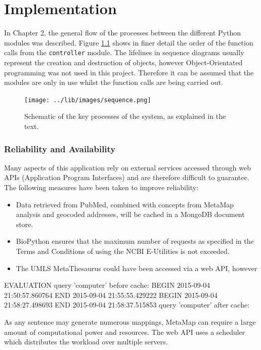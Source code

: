 \documentclass[Report.tex]{subfiles}
\begin{document}
\chapter{Implementation}

In Chapter 2, the general flow of the processes between the different Python modules was described. Figure \ref{fig:sequence} shows in finer detail the order of the function calls from the \texttt{controller} module. The lifelines in sequence diagrams usually represent the creation and destruction of objects, however Object-Orientated programming was not used in this project. Therefore it can be assumed that the modules are only in use whilst the function calls are being carried out.

\begin{figure}[h!]
\texttt{[image: ../lib/images/sequence.png]}
\caption{Schematic of the key processes of the system, as explained in the text.}
\label{fig:sequence}
\end{figure}

\subsection{Reliability and Availability}
Many aspects of this application rely on external services accessed through web APIs (Application Program Interfaces) and are therefore difficult to guarantee. The following measures have been taken to improve reliability:
\begin{itemize}
\item Data retrieved from PubMed, combined with concepts from MetaMap analysis and geocoded addresses, will be cached in a MongoDB document store.
\item BioPython ensures that the maximum number of requests as specified in the Terms and Conditions of using the NCBI E-Utilities\cite{} is not exceeded.
\item The UMLS MetaThesaurus could have been accessed via a web API, however 
\end{itemize}


EVALUATION
query 'computer' before cache: 
BEGIN 2015-09-04 21:50:57.860764
END 2015-09-04 21:55:55.429222
BEGIN 2015-09-04 21:58:27.498693
END 2015-09-04 21:58:37.515853
query 'computer' after cache: 

As any sentence may generate numerous mappings, MetaMap can require a large amount of computational power and resources\cite{metamap2010}. 
The web API uses a scheduler which distributes the workload over multiple servers. \cite{metamap2010}
\end{document}

